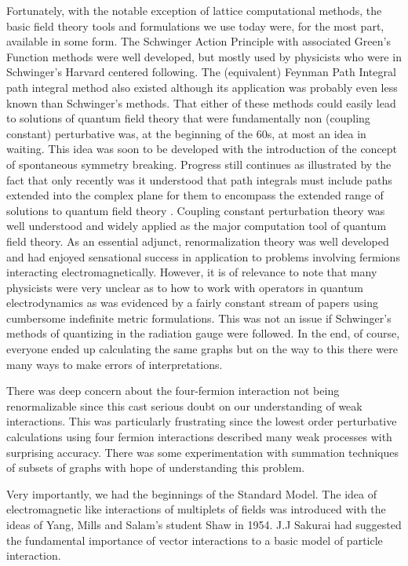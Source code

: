 \documentclass[preprintnumbers,12pt]{revtex4-2}
\begin{document}
Fortunately, with the notable exception of lattice computational
methods, the basic field theory tools and formulations we use today
were, for the most part, available in some form. The Schwinger Action
Principle with associated Green's Function methods were well
developed, but mostly used by physicists who were in Schwinger's
Harvard centered following.  The (equivalent) Feynman Path Integral
path integral method also existed although its application was
probably even less known than Schwinger's methods. That either of
these methods could easily lead to solutions of quantum field theory
that were fundamentally non (coupling constant) perturbative was, at
the beginning of the 60s, at most an idea in waiting. This idea was
soon to be developed with the introduction of the concept of
spontaneous symmetry breaking. Progress still continues as illustrated
by the fact that only recently was it understood that path integrals
must include paths extended into the complex plane for them to
encompass the extended range of solutions to quantum field theory
\cite{ggg;1996,ggzg;2007}. Coupling constant perturbation theory was
well understood and widely applied as the major computation tool of
quantum field theory.  As an essential adjunct, renormalization theory
was well developed and had enjoyed sensational success in application
to problems involving fermions interacting
electromagnetically. However, it is of relevance to note that many
physicists were very unclear as to how to work with operators in
quantum electrodynamics as was evidenced by a fairly constant stream
of papers using cumbersome indefinite metric formulations. This was
not an issue if Schwinger's methods of quantizing in the radiation
gauge were followed. In the end, of course, everyone ended up
calculating the same graphs but on the way to this there were many
ways to make errors of interpretations.

There was deep concern about the four-fermion interaction not being
renormalizable since this cast serious doubt on our understanding of
weak interactions. This was particularly frustrating since the lowest
order perturbative calculations using four fermion interactions
described many weak processes with surprising accuracy. There was some
experimentation with summation techniques of subsets of graphs with
hope of understanding this problem.


Very importantly, we had the beginnings of the Standard Model.
The idea of electromagnetic like interactions of multiplets of fields
was introduced with the ideas of Yang, Mills and Salam's student Shaw
\cite{ym;1954,ss;1955} in 1954.  J.J Sakurai \cite{sak;1960} had
suggested the fundamental importance of vector interactions to a basic
model of particle interaction.
\end{document}
